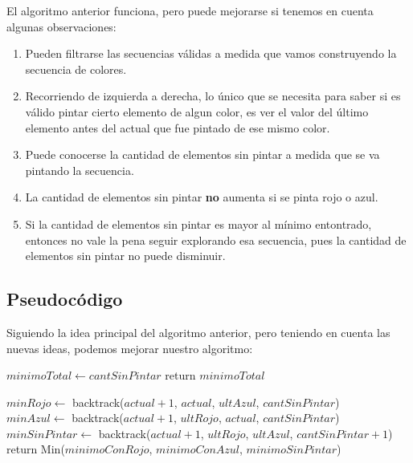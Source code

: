 El algoritmo anterior funciona, pero puede mejorarse si tenemos en cuenta algunas observaciones:

\begin{enumerate}
\item Pueden filtrarse las secuencias válidas a medida que vamos construyendo la secuencia de colores.
\item Recorriendo de izquierda a derecha, lo único que se necesita para saber si es válido pintar cierto elemento de algun color, es ver el valor del último elemento antes del actual que fue pintado de ese mismo color.
\item Puede conocerse la cantidad de elementos sin pintar a medida que se va pintando la secuencia.
\item La cantidad de elementos sin pintar \textbf{no} aumenta si se pinta rojo o azul.
\item Si la cantidad de elementos sin pintar es mayor al mínimo entontrado, entonces no vale la pena seguir explorando esa secuencia, pues la cantidad de elementos sin pintar no puede disminuir.
\end{enumerate}

\subsection{Pseudocódigo}

Siguiendo la idea principal del algoritmo anterior, pero teniendo en cuenta las nuevas ideas, podemos mejorar nuestro algoritmo:

\begin{algorithm}
\begin{algorithmic}

    \State $minimoTotal \gets cantSinPintar$
    \State return $minimoTotal$
\Else

    \State $minRojo \gets$ backtrack($actual + 1$, $actual$, $ultAzul$, $cantSinPintar$)
  \EndIf \\

    \State $minAzul \gets$ backtrack($actual + 1$, $ultRojo$, $actual$, $cantSinPintar$)
  \EndIf \\

    \State $minSinPintar \gets$ backtrack($actual + 1$, $ultRojo$, $ultAzul$, $cantSinPintar + 1$)
  \EndIf \\

  \State return Min($minimoConRojo$, $minimoConAzul$, $minimoSinPintar$)

\EndIf
\EndProcedure
\end{algorithmic}
\end{algorithm}



